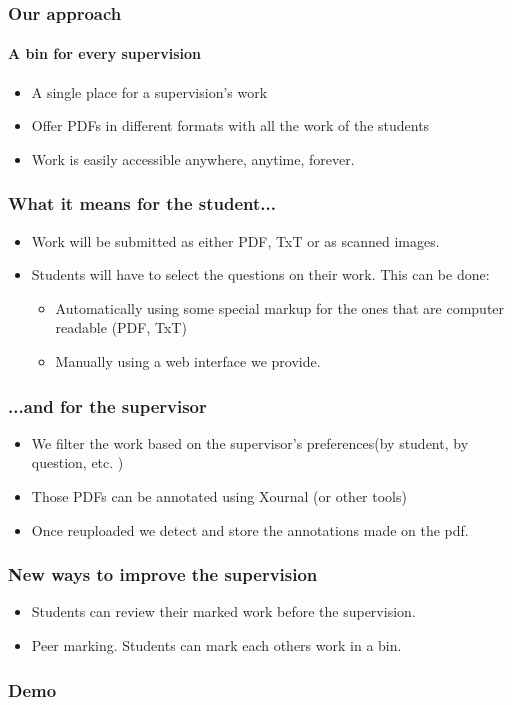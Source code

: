 \documentclass{beamer}
\begin{document}
  	\begin{frame}
    	\frametitle{Our approach}
    	\framesubtitle{A bin for every supervision}
    	\begin{itemize}
    		\item A single place for a supervision's work
    	    \item Offer PDFs in different formats with all the work of the students  
    		\item Work is easily accessible anywhere, anytime, forever.
    	\end{itemize}
    \end{frame}
    \begin{frame}
    	\frametitle{What it means for the student...}
    	\begin{itemize}
    		\item Work will be submitted as either PDF, TxT or as scanned images.
    		\item Students will have to select the questions on their work. This can be done:
    		\begin{itemize}
    			\item Automatically using some special markup for the ones that are computer readable (PDF, TxT)
    			\item Manually using a web interface we provide.    			\end{itemize}
    	\end{itemize}    	
    \end{frame}
    
    \begin{frame}
    	\frametitle{...and for the supervisor}
    	\begin{itemize}
    		\item We filter the work based on the supervisor's preferences(by student, by question, etc. )
    		\item Those PDFs can be annotated using Xournal (or other tools)
    		\item Once reuploaded we detect and store the annotations made on the pdf.
    	\end{itemize}
    \end{frame}
    
    \begin{frame}
    	\frametitle{New ways to improve the supervision}
    	\begin{itemize}
    		\item Students can review their marked work before the supervision.
    		\item Peer marking. Students can mark each others work in a bin.
    		
 
    	\end{itemize}
    \end{frame}
    \begin{frame}
    	\frametitle{Demo}
    \end{frame}
\end{document}
